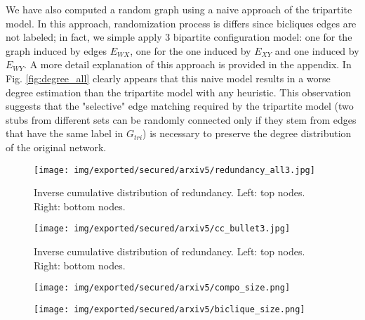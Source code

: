 \documentclass[table]{report}
\begin{document}
We have also computed a random graph using a naive approach of the tripartite model. In this approach, randomization process is differs since bicliques edges are not labeled; in fact, we simple apply 3 bipartite configuration model: one for the graph induced by edges $E_{WX}$, one for the one induced by $E_{XY}$ and one induced by $E_{WY}$.  A more detail explanation of this approach is provided in the appendix. 
In Fig. \ref{fig:degree_all} clearly appears that this naive model results in a worse degree estimation than the tripartite model with any heuristic. This observation suggests that the "selective" edge matching required by the tripartite model (two stubs from different sets can be randomly connected only if they stem from edges that have the same label in ${G_{tri}}$) is necessary to preserve the degree distribution of the original network. 


\begin{figure}[h]%
\centering
\texttt{[image: img/exported/secured/arxiv5/redundancy\_all3.jpg]}
\caption{Inverse cumulative distribution of redundancy. Left: top nodes. Right: bottom nodes.}
\label{fig:redundancy_all}
\end{figure}
\FloatBarrier


\begin{figure}[h]%
\centering
\texttt{[image: img/exported/secured/arxiv5/cc\_bullet3.jpg]}
\caption{Inverse cumulative distribution of redundancy. Left: top nodes. Right: bottom nodes.}
\label{fig:redundancy_all}
\end{figure}
\FloatBarrier


%
%
%
%
%



\begin{figure}[h]%
\centering
\texttt{[image: img/exported/secured/arxiv5/compo\_size.png]}
\caption{}
\label{fig:compo_size}
\end{figure}
\FloatBarrier


\begin{figure}[h]%
\centering
\texttt{[image: img/exported/secured/arxiv5/biclique\_size.png]}
\caption{}
\label{fig:biclique_size}
\end{figure}
\FloatBarrier
\end{document}
